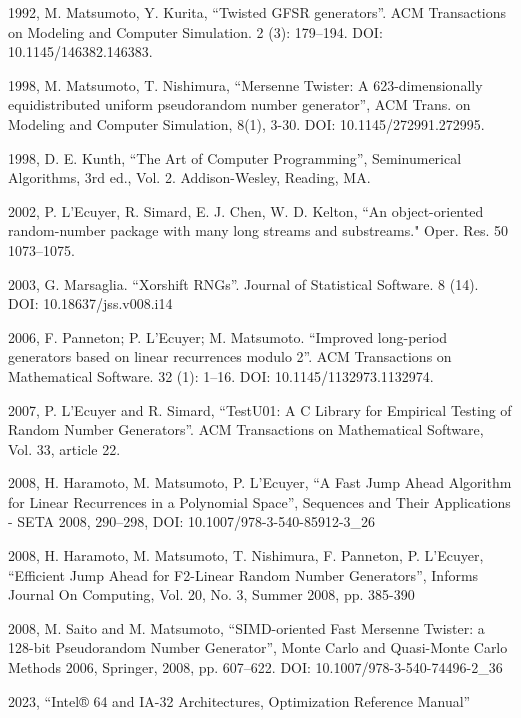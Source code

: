 \documentclass[preprint,1p,times]{elsarticle}
\begin{document}
\begin{thebibliography}{9}

 1992, M. Matsumoto, Y. Kurita, ``Twisted GFSR generators''. ACM Transactions on Modeling and Computer Simulation. 2 (3): 179--194. DOI: 10.1145/146382.146383.

 1998, M. Matsumoto, T. Nishimura, ``Mersenne Twister: A 623-dimensionally equidistributed uniform pseudorandom number generator'', ACM Trans. on Modeling and Computer Simulation, 8(1), 3-30. DOI: 10.1145/272991.272995.

 1998, D. E. Kunth, ``The Art of Computer Programming'', Seminumerical Algorithms, 3rd ed., Vol. 2. Addison-Wesley, Reading, MA.

 2002, P. L’Ecuyer, R. Simard, E. J. Chen, W. D. Kelton, ``An object-oriented random-number package with many long streams and substreams." Oper. Res. 50 1073--1075.

 2003, G. Marsaglia. ``Xorshift RNGs''. Journal of Statistical Software. 8 (14). DOI: 10.18637/jss.v008.i14

 2006, F. Panneton; P. L'Ecuyer; M. Matsumoto. ``Improved long-period generators based on linear recurrences modulo 2''. ACM Transactions on Mathematical Software. 32 (1): 1--16. DOI: 10.1145/1132973.1132974.

 2007, P. L'Ecuyer and R. Simard, ``TestU01: A C Library for Empirical Testing of Random Number Generators''. ACM Transactions on Mathematical Software, Vol. 33, article 22.

 2008, H. Haramoto, M. Matsumoto, P. L’Ecuyer, ``A Fast Jump Ahead Algorithm for Linear Recurrences in a Polynomial Space'', Sequences and Their Applications - SETA 2008, 290--298, DOI: 10.1007/978-3-540-85912-3\_26

 2008, H. Haramoto, M. Matsumoto, T. Nishimura, F. Panneton, P. L’Ecuyer, ``Efficient Jump Ahead for F2-Linear Random Number Generators'', Informs Journal On Computing, Vol. 20, No. 3, Summer 2008, pp. 385-390

 2008, M. Saito and M. Matsumoto, ``SIMD-oriented Fast Mersenne Twister: a 128-bit Pseudorandom Number Generator'', Monte Carlo and Quasi-Monte Carlo Methods 2006, Springer, 2008, pp. 607--622. DOI: 10.1007/978-3-540-74496-2\_36

 2023, ``Intel® 64 and IA-32 Architectures, Optimization Reference Manual''

\end{thebibliography}
\end{document}
